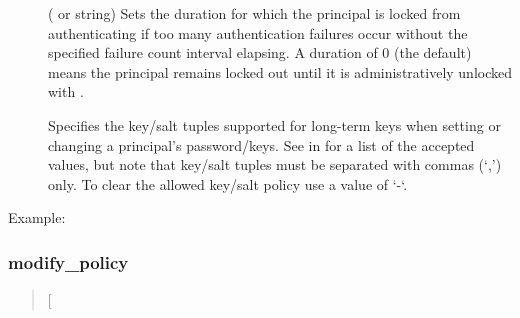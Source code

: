 \documentclass[letterpaper,10pt,english]{sphinxmanual}
\begin{document}
\label{\detokenize{admin/admin_commands/kadmin_local:policy-lockoutduration}}\begin{description}
\item[{ }] \leavevmode
( or  string) Sets the duration for
which the principal is locked from authenticating if too many
authentication failures occur without the specified failure count
interval elapsing.  A duration of 0 (the default) means the
principal remains locked out until it is administratively unlocked
with .

\item[{}] \leavevmode
Specifies the key/salt tuples supported for long-term keys when
setting or changing a principal’s password/keys.  See
{\hyperref[\detokenize{admin/conf_files/kdc_conf:keysalt-lists}]{}} in {\hyperref[\detokenize{admin/conf_files/kdc_conf:kdc-conf-5}]{}} for a list of the
accepted values, but note that key/salt tuples must be separated
with commas (‘,’) only.  To clear the allowed key/salt policy use
a value of ‘-‘.

\end{description}

Example:

%
\begin{sphinxVerbatim}[commandchars=\\\{\}]
      
\end{sphinxVerbatim}
\label{\detokenize{admin/admin_commands/kadmin_local:add-policy-end}}

\subsubsection{modify\_policy}
\label{\detokenize{admin/admin_commands/kadmin_local:id13}}\label{\detokenize{admin/admin_commands/kadmin_local:modify-policy}}\label{\detokenize{admin/admin_commands/kadmin_local:add-policy-end}}\begin{quote}

 {[}\sphinxstyleemphasis{options}{]} 
\end{quote}
\end{document}
